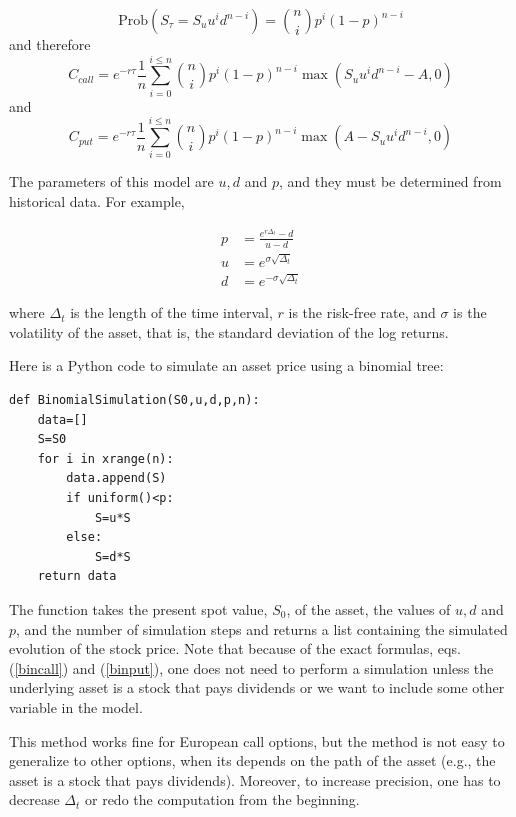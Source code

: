 \documentclass[justified,sixbynine]{tufte-book}
\theoremstyle{plain}%
\theoremstyle{definition}
\theoremstyle{remark}
\begin{document}
\begin{fullwidth}
\begin{equation}
\textrm{Prob}(S_\tau =S_uu^id^{n-i})=\binom nip^i(1-p)^{n-i}
\end{equation}
and therefore
\begin{equation}
C_{call}=e^{-r\tau }\frac 1n\sum_{i=0}^{i\leq n}\binom nip^i(1-p)^{n-i}\max
(S_uu^id^{n-i}-A,0)  \label{bincall}
\end{equation}
and
\begin{equation}
C_{put}=e^{-r\tau }\frac 1n\sum_{i=0}^{i\leq n}\binom nip^i(1-p)^{n-i}\max
(A-S_uu^id^{n-i},0)  \label{binput}
\end{equation}

The parameters of this model are $u,d$ and $p$, and they must be determined
from historical data. For example,

\begin{align}
p &= \frac{e^{r\Delta_t} - d}{u-d} \\
u &= e^{\sigma\sqrt{\Delta_t}} \\
d &= e^{-\sigma\sqrt{\Delta_t}}
\end{align}

where $\Delta_t$ is the length of the time interval, $r$ is the risk-free rate, and $\sigma$ is the volatility of the asset, that is, the standard deviation of the log returns.

Here is a Python code to simulate an asset price using a binomial tree:
\begin{lstlisting}
def BinomialSimulation(S0,u,d,p,n):
    data=[]
    S=S0
    for i in xrange(n):
        data.append(S)
        if uniform()<p:
            S=u*S
        else:
            S=d*S
    return data
\end{lstlisting}

The function takes the present spot value, $S_0$, of the asset, the values
of $u,d$ and $p$, and the number of simulation steps and returns a list
containing the simulated evolution of the stock price. Note that because of
the exact formulas, eqs.(\ref{bincall}) and (\ref{binput}), one does not need
to perform a simulation unless the underlying asset is a stock that pays
dividends or we want to include some other variable in the model.

This method works fine for European call options, but the method is not easy to
generalize to other options, when its depends on the path of
the asset (e.g., the asset is a stock that pays dividends). Moreover,
to increase precision, one has to decrease $\Delta _t$ or redo the
computation from the beginning.


\end{fullwidth}
\end{document}
